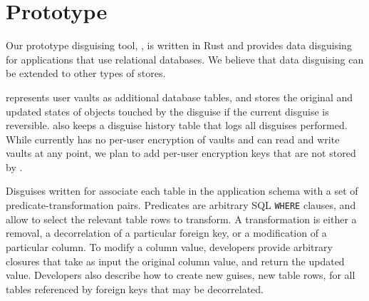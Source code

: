 \section{Prototype}
\label{sec:proto}
%
Our prototype disguising tool, \sys, is written in Rust and 
provides data disguising for applications that use relational databases.
%
We believe that data disguising can be extended to other types of stores.
%

%
\sys represents user vaults as additional database tables, and stores the original and updated
states of objects touched by the disguise if the current disguise is reversible. \sys also keeps a
disguise history table that logs all disguises performed.  While \sys currently has no per-user
encryption of vaults and can read and write vaults at any point, we plan to add per-user encryption
keys that are not stored by \sys.

%
Disguises written for \sys associate each table in the application schema with a set of
predicate-transformation pairs. Predicates are arbitrary SQL \texttt{WHERE} clauses, and allow \sys
to select the relevant table rows to transform. A transformation is either a removal, a
decorrelation of a particular foreign key, or a modification of a particular column. To modify a
column value, developers provide arbitrary closures that take as input the original column value,
and return the updated value.
%
Developers also describe how to create new guises, \ie new table rows, for all
tables referenced by foreign keys that may be decorrelated.

\iffalse
\sys also provides a specification of the end-state after it applies a sequence of
disguises; this allows developers to double-check that their disguises achieve their privacy
transformation goals.
%
To do so, \sys automatically generates a sequence of materialized view filters that, when applied on top of each
other, correspond to the state achieved by composing the disguises. 
Developers specify assertions (\eg all objects belonging to departing user Bob have
been removed) that \sys ensures holds on the materialized view specification.

\sys's composition technique may reorder filters from one disguise with those from a subsequent disguise in order to achieve the
correct result.
%
\sys maps these filters directly to physical database operations (where reordering filters corresponds to
temporarily undoing vault entries). Thus, the developer can use the materialized view filters as a way to
test the correctness of \sys and their disguises prior to permanently altering the application database. 
\fi
